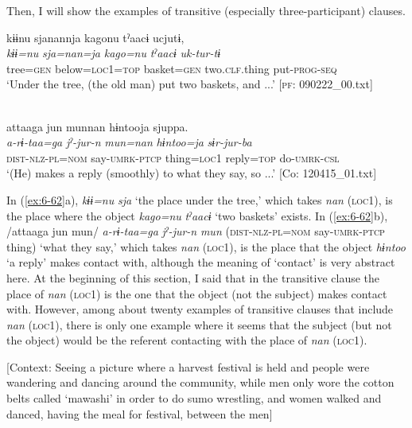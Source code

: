 Then, I will show the examples of transitive (especially three-participant) clauses.

\ea\label{ex:6-62}
\ea {\TM}  kɨɨnu  sjanannja  kagonu  tˀaacɨ  ucjutɨ,\\
\glll \textit{kɨɨ=nu}  \textit{sja=nan=ja}  \textit{kago=nu}  \textit{tˀaacɨ}  \textit{uk-tur-tɨ}\\
tree=\textsc{gen}  below=\textsc{loc1}=\textsc{top}  basket=\textsc{gen}  two.\textsc{clf}.thing  put-\textsc{prog}-\textsc{seq}\\
\glt ‘Under the tree, (the old man) put two baskets, and ...’ [\textsc{pf}: 090222\_00.txt]
\z

\ex{}\\
{\TM}
\glll  attaaga  jun  munnan  hɨntooja     sjuppa.\\
\textit{a-rɨ-taa=ga}  \textit{jˀ-jur-n}  \textit{mun=nan}  \textit{hɨntoo=ja} \textit{sɨr-jur-ba}\\
\textsc{dist}-\textsc{nlz}-\textsc{pl}=\textsc{nom}  say-\textsc{umrk}-\textsc{ptcp}  thing=\textsc{loc1}  reply=\textsc{top}   do-\textsc{umrk}-\textsc{csl}\\
\glt ‘(He) makes a reply (smoothly) to what they say, so ...’ [Co: 120415\_01.txt]
\z

In (\ref{ex:6-62}a), \textit{kɨɨ=nu} \textit{sja} ‘the place under the tree,’ which takes \textit{nan} (\textsc{loc1}), is the place where the object \textit{kago=nu} \textit{tˀaacɨ} ‘two baskets’ exists. In (\ref{ex:6-62}b), /attaaga jun mun/ \textit{a-rɨ-taa=ga} \textit{jˀ-jur-n} \textit{mun} (\textsc{dist}-\textsc{nlz}-\textsc{pl}=\textsc{nom} say-\textsc{umrk}-\textsc{ptcp} thing) ‘what they say,’ which takes \textit{nan} (\textsc{loc1}), is the place that the object \textit{hɨntoo} ‘a reply’ makes contact with, although the meaning of ‘contact’ is very abstract here. At the beginning of this section, I said that in the transitive clause the place of \textit{nan} (\textsc{loc1}) is the one that the object (not the subject) makes contact with. However, among about twenty examples of transitive clauses that include \textit{nan} (\textsc{loc1}), there is only one example where it seems that the subject (but not the object) would be the referent contacting with the place of \textit{nan} (\textsc{loc1}).

\ea\label{ex:6-63}
 [Context: Seeing a picture where a harvest festival is held and people were wandering and dancing around the community, while men only wore the cotton belts called ‘mawashi’ in order to do sumo wrestling, and women walked and danced, having the meal for festival, between the men]\\

